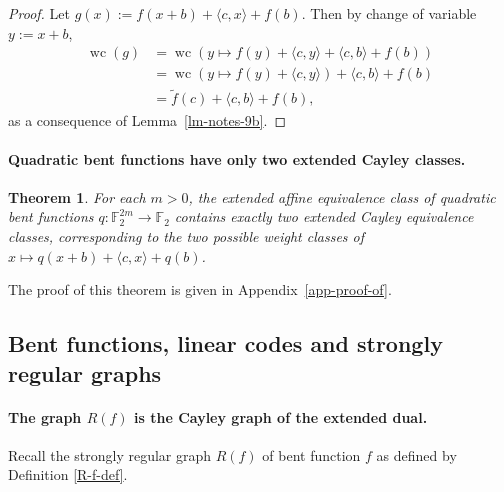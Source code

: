 \documentclass[12pt,a4paper]{article}
\newcommand{\mb}[1]{\mathbb{#1}}
\newcommand{\F}{\mb{F}}
\newcommand{\To}{\rightarrow}
\newcommand{\dual}[1]{\widetilde{#1}}
\newcommand{\weightclass}[1]{\operatorname{wc}\left(#1\right)}
\newtheorem{Theorem}{Theorem}
\begin{document}
\begin{proof}
Let $g(x) := f(x+b) + \langle c, x \rangle + f(b)$.
Then by change of variable $y:=x+b$,
\begin{align*}
\weightclass{g}
&=
\weightclass{y \mapsto f(y) + \langle c, y \rangle + \langle c, b \rangle + f(b)}
\\
&=
\weightclass{y \mapsto f(y) + \langle c, y \rangle} + \langle c, b \rangle + f(b)
\\
&=
\dual{f}(c) + \langle c, b \rangle + f(b),
\end{align*}
as a consequence of Lemma~\ref{lm-notes-9b}.
\end{proof}


\paragraph*{Quadratic bent functions have only two extended Cayley classes.}
\begin{Theorem}
\label{th-Quadratic-Classes}
For each $m>0$, the extended affine equivalence class of quadratic bent functions
$q : \F_2^{2m} \To \F_2$ contains exactly two extended Cayley equivalence classes,
corresponding to the two possible weight classes of
$x \mapsto q(x+b) + \langle c, x \rangle + q(b)$.
\end{Theorem}

The proof of this theorem is given in Appendix~\ref{app-proof-of}.

\subsection{Bent functions, linear codes and strongly regular graphs}
\paragraph*{The graph $R(f)$ is the Cayley graph of the extended dual.}
Recall the strongly regular graph $R(f)$ of bent function $f$ as defined by Definition
\ref{R-f-def}.
\end{document}

